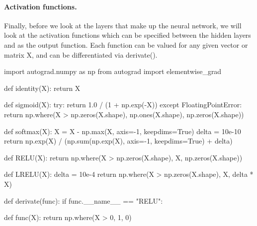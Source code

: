 \documentclass[%
oneside,                 %
final,                   %
10pt]{article}
\begin{document}
\paragraph{Activation functions.}
Finally, before we look at the layers that make up the neural network,
we will look at the activation functions which can be specified
between the hidden layers and as the output function. Each function
can be valued for any given vector or matrix X, and can be
differentiated via derivate().


















































\bpycod

import autograd.numpy as np
from autograd import elementwise_grad

def identity(X):
    return X


def sigmoid(X):
    try:
        return 1.0 / (1 + np.exp(-X))
    except FloatingPointError:
        return np.where(X > np.zeros(X.shape), np.ones(X.shape), np.zeros(X.shape))


def softmax(X):
    X = X - np.max(X, axis=-1, keepdims=True)
    delta = 10e-10
    return np.exp(X) / (np.sum(np.exp(X), axis=-1, keepdims=True) + delta)


def RELU(X):
    return np.where(X > np.zeros(X.shape), X, np.zeros(X.shape))


def LRELU(X):
    delta = 10e-4
    return np.where(X > np.zeros(X.shape), X, delta * X)


def derivate(func):
    if func.__name__ == "RELU":

        def func(X):
            return np.where(X > 0, 1, 0)
\end{document}
